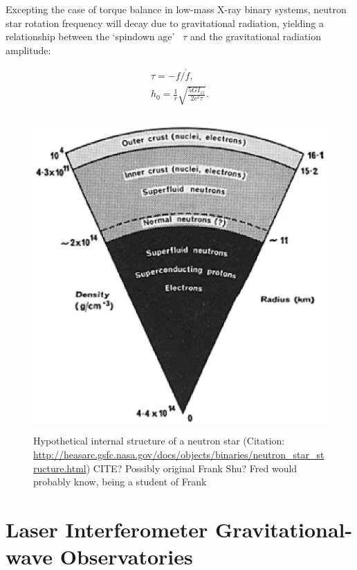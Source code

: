 Excepting the case of torque balance in low-mass X-ray binary systems, neutron star rotation frequency will decay due to gravitational radiation, yielding a relationship between the `spindown age'~\cite{Brady1998} $\tau$ and the gravitational radiation amplitude:

        \begin{eqnarray}
        \tau = -f / \dot{f}, \\
        h_0 = \frac{1}{r} \sqrt{\frac{5 G I_{zz}}{2 c^2 \tau}}.
        \end{eqnarray}

	\begin{figure}
	\begin{center}
	\includegraphics[height=120mm, width=160mm]{neutron_star_structure.eps}
	\caption{Hypothetical internal structure of a neutron star (Citation: \url{http://heasarc.gsfc.nasa.gov/docs/objects/binaries/neutron_star_structure.html}) CITE? Possibly original Frank Shu? Fred would probably know, being a student of Frank}
	\label{neutron_star_structure}
	\end{center}
	\end{figure}


    \section{Laser Interferometer Gravitational-wave Observatories}
    \label{LIGO}
        

